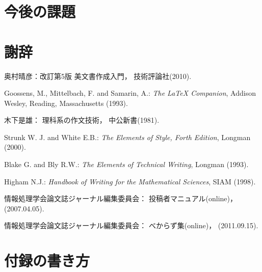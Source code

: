 \documentclass[submit,techrep]{ipsj}
\begin{document}
\section{今後の課題}

\section{謝辞}

\begin{thebibliography}{10}



奥村晴彦：改訂第5版 \LaTeXe 美文書作成入門，
技術評論社(2010).

Goossens, M., Mittelbach, F. and Samarin, A.:
{\it The LaTeX Companion},
Addison Wesley, Reading, Massachusetts (1993).

木下是雄：
理科系の作文技術，
中公新書(1981).

Strunk W. J. and White E.B.:
{\it The Elements of Style, Forth Edition},
Longman (2000).

Blake G. and Bly R.W.:
{\it The Elements of Technical Writing},
Longman (1993).

Higham N.J.:
{\it Handbook of Writing for the Mathematical Sciences},
SIAM (1998).

情報処理学会論文誌ジャーナル編集委員会：
投稿者マニュアル(online)，
(2007.04.05).

情報処理学会論文誌ジャーナル編集委員会：
べからず集(online)，
(2011.09.15).

\end{thebibliography}




\appendix
\section{付録の書き方}
\end{document}
